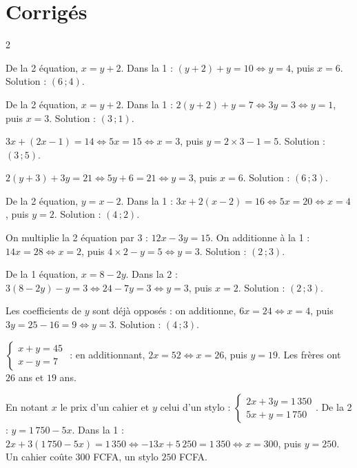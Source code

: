 \section{Corrigés}
\begin{multicols}{2}

De la 2\ieme{} équation, $x=y+2$. Dans la 1\iere{} : $(y+2)+y=10\iff y=4$, puis $x=6$.
Solution : $(6\,;4)$.

De la 2\ieme{} équation, $x=y+2$. Dans la 1\iere{} : $2(y+2)+y=7\iff3y=3\iff y=1$, puis
$x=3$. Solution : $(3\,;1)$.

$3x+(2x-1)=14\iff5x=15\iff x=3$, puis $y=2\times3-1=5$. Solution : $(3\,;5)$.

$2(y+3)+3y=21\iff5y+6=21\iff y=3$, puis $x=6$. Solution : $(6\,;3)$.

De la 2\ieme{} équation, $y=x-2$. Dans la 1\iere{} : $3x+2(x-2)=16\iff5x=20\iff x=4$, puis
$y=2$. Solution : $(4\,;2)$.

On multiplie la 2\ieme{} équation par $3$ : $12x-3y=15$. On additionne à la 1\iere{} :
$14x=28\iff x=2$, puis $4\times2-y=5\iff y=3$. Solution : $(2\,;3)$.

De la 1\iere{} équation, $x=8-2y$. Dans la 2\ieme{} : $3(8-2y)-y=3\iff24-7y=3\iff y=3$,
puis $x=2$. Solution : $(2\,;3)$.

Les coefficients de $y$ sont déjà opposés : on additionne, $6x=24\iff x=4$, puis
$3y=25-16=9\iff y=3$. Solution : $(4\,;3)$.

$\left\{\begin{array}{l}x+y=45\\x-y=7\end{array}\right.$ : en additionnant, $2x=52\iff x=26$,
puis $y=19$. Les frères ont $26$ ans et $19$ ans.

En notant $x$ le prix d'un cahier et $y$ celui d'un stylo :
$\left\{\begin{array}{l}2x+3y=1\,350\\5x+y=1\,750\end{array}\right.$. De la 2\ieme{} :
$y=1\,750-5x$. Dans la 1\iere{} : $2x+3(1\,750-5x)=1\,350\iff-13x+5\,250=1\,350\iff x=300$,
puis $y=250$. Un cahier coûte $300$ FCFA, un stylo $250$ FCFA.


\end{multicols}
